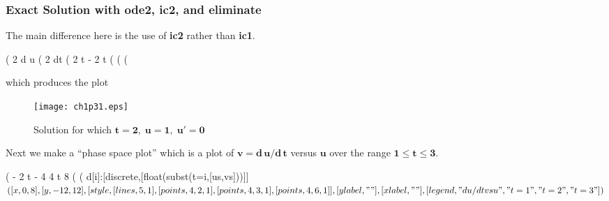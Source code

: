 \documentclass[11pt]{article}
\begin{document}
\subsubsection{Exact Solution with \textbf{ode2}, \textbf{ic2}, and \textbf{eliminate}}
The main difference here is the use of \textbf{ic2} rather than \textbf{ic1}.
\begin{myVerbatim}
(%
                                    2
                                   d u
(%
                                     2
                                   dt
(%
                                    2 t         - 2 t
(%
(%
(%
\end{myVerbatim}
\newpage
{}
which produces the plot
\smallskip
\begin{figure} [h]  
   \centerline{\texttt{[image: ch1p31.eps]} }
	\caption{Solution for which $\mathbf{t = 2, \;u = 1, \; u' = 0}$  }
\end{figure}

Next we make a ``phase space plot'' which is a plot of $$
  versus $$ over the range $$.
\begin{myVerbatim}
(%
                             - 2 t - 4    4 t     8
(%
(%
        d[i]:[discrete,[float(subst(t=i,[us,vs]))]]$
(%
            [x,0,8],[y,-12,12],
          [style, [lines,5,1],[points,4,2,1],
            [points,4,3,1],[points,4,6,1]],
          [ylabel," "],[xlabel," "],
           [legend," du/dt vs u "," t = 1 ","t = 2","t = 3"] )$
\end{myVerbatim}
\end{document}
